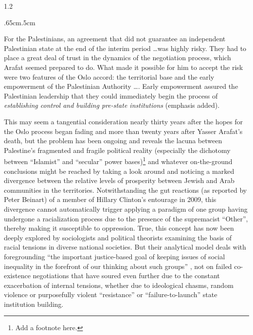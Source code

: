 \documentclass[../unravbook.tex]{subfiles}
\begin{document}
\begin{spacing}{1.2}
\begin{adjustwidth}{.65cm}{.5cm}
   \begin{singlespace}
    For the Palestinians, an agreement that did not guarantee an independent Palestinian state at the end of the interim period \ldots was highly risky. They had to place a great deal of trust in the dynamics of the negotiation process, which Arafat seemed prepared to do. What made it possible for him to accept the risk were two features of the Oslo accord: the territorial base and the early empowerment of the Palestinian Authority \ldots. Early empowerment assured the Palestinian leadership that they could immediately begin the process of \textit{establishing control and building pre-state institutions} (emphasis added).   
  \end{singlespace}
\end{adjustwidth}

This may seem a tangential consideration nearly thirty years after the hopes for the Oslo process began fading and more than twenty years after Yasser Arafat's death, but the problem has been ongoing and reveals the lacuna between Palestine's fragmented and fragile political reality (especially the dichotomy between \enquote{Islamist} and \enquote{secular} power bases)\footnote{Add a footnote here.} and whatever on-the-ground conclusions might be reached by taking a look around and noticing a marked divergence between the relative levels of prosperity between Jewish and Arab communities in the territories. Notwithstanding the gut reactions (as reported by Peter Beinart) of a member of Hillary Clinton's entourage in 2009, this divergence cannot automatically trigger applying a paradigm of one group having undergone a racialization process due to the presence of the supremacist \enquote{Other}, thereby making it susceptible to oppression. True, this concept has now been deeply explored by sociologists and political theorists examining the basis of racial tensions in diverse national societies. But their analytical model deals with foregrounding \enquote{the important justice-based goal of keeping issues of social inequality in the forefront of our thinking about such groups} \parencite[304]{Blum-2010}, not on failed co-existence negotiations that have soured even further due to the constant exacerbation of internal tensions, whether due to ideological chasms, random violence or purposefully violent \enquote{resistance} or \enquote{failure-to-launch} state institution building. 


\end{spacing}
\end{document}
